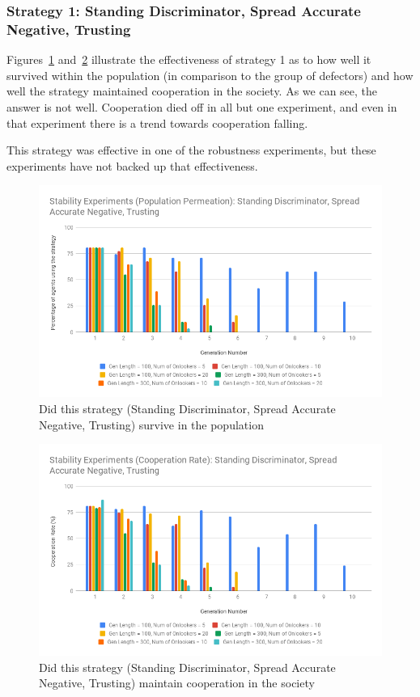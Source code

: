 \documentclass[]{final_report}
\begin{document}
\subsubsection{Strategy 1: Standing Discriminator, Spread Accurate Negative, Trusting}
Figures~\ref{fig:sdsantStabPop} and~\ref{fig:sdsantStabCoop} illustrate the effectiveness of strategy 1 as to how well it survived within the population (in comparison to the group of defectors) and how well the strategy maintained cooperation in the society. As we can see, the answer is not well. Cooperation died off in all but one experiment, and even in that experiment there is a trend towards cooperation falling.\par 
This strategy was effective in one of the robustness experiments, but these experiments have not backed up that effectiveness. 
\begin{figure}
\begin{framed}
	\includegraphics[width=\textwidth]{sdsantStabPop.png}
	\caption{Did this strategy (Standing Discriminator, Spread Accurate Negative, Trusting) survive in the population}
	\label{fig:sdsantStabPop}
\end{framed}
\end{figure}
\begin{figure}
\begin{framed}
	\includegraphics[width=\textwidth]{sdsantStabCoop.png}
	\caption{Did this strategy (Standing Discriminator, Spread Accurate Negative, Trusting) maintain cooperation in the society}
	\label{fig:sdsantStabCoop}
\end{framed}
\end{figure}
\end{document}

